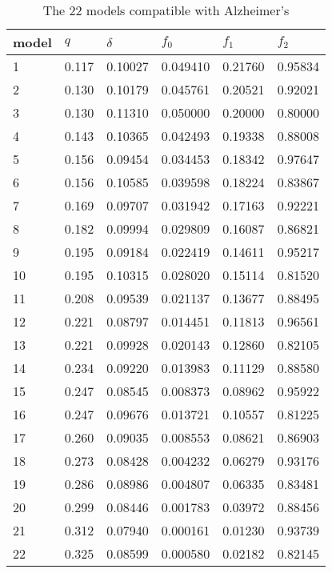 \documentclass[11pt]{article}
\begin{document}
\begin{table}[h]
\caption{The 22 models compatible with Alzheimer's\label{models6}}
\centering
\vskip 0.3cm
\begin{tabular}{llllll}
\hline
model &   $q$  & $\delta$ &    $f_0$ &    $f_1$  &    $f_2$\\
\hline
  1   & 0.117  & 0.10027  & 0.049410 &  0.21760  &  0.95834\\
  2   & 0.130  & 0.10179  & 0.045761 &  0.20521  &  0.92021\\
  3   & 0.130  & 0.11310  & 0.050000 &  0.20000  &  0.80000\\
  4   & 0.143  & 0.10365  & 0.042493 &  0.19338  &  0.88008\\
  5   & 0.156  & 0.09454  & 0.034453 &  0.18342  &  0.97647\\
  6   & 0.156  & 0.10585  & 0.039598 &  0.18224  &  0.83867\\
  7   & 0.169  & 0.09707  & 0.031942 &  0.17163  &  0.92221\\
  8   & 0.182  & 0.09994  & 0.029809 &  0.16087  &  0.86821\\
  9   & 0.195  & 0.09184  & 0.022419 &  0.14611  &  0.95217\\
 10   & 0.195  & 0.10315  & 0.028020 &  0.15114  &  0.81520\\
 11   & 0.208  & 0.09539  & 0.021137 &  0.13677  &  0.88495\\
 12   & 0.221  & 0.08797  & 0.014451 &  0.11813  &  0.96561\\
 13   & 0.221  & 0.09928  & 0.020143 &  0.12860  &  0.82105\\
 14   & 0.234  & 0.09220  & 0.013983 &  0.11129  &  0.88580\\
 15   & 0.247  & 0.08545  & 0.008373 &  0.08962  &  0.95922\\
 16   & 0.247  & 0.09676  & 0.013721 &  0.10557  &  0.81225\\
 17   & 0.260  & 0.09035  & 0.008553 &  0.08621  &  0.86903\\
 18   & 0.273  & 0.08428  & 0.004232 &  0.06279  &  0.93176\\
 19   & 0.286  & 0.08986  & 0.004807 &  0.06335  &  0.83481\\
 20   & 0.299  & 0.08446  & 0.001783 &  0.03972  &  0.88456\\
 21   & 0.312  & 0.07940  & 0.000161 &  0.01230  &  0.93739\\
 22   & 0.325  & 0.08599  & 0.000580 &  0.02182  &  0.82145\\
\hline
\end{tabular}
\end{table}
\end{document}
